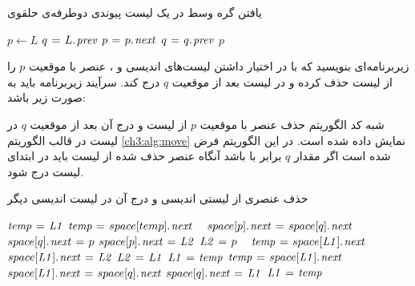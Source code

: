 \begin{algorithm}
\caption{یافتن گره وسط در یک لیست پیوندی دوطرفه‌ی حلقوی}\label{ch3:alg:findMiddle}
\begin{latin}
\begin{algorithmic}[1]
    \State    $p \gets L$
    \State    $q \mathrel{\hspace{1pt}=\hspace{1pt}} L.\hspace*{1pt}\mathit{prev}$
        \State    $p \mathrel{\hspace{1pt}=\hspace{1pt}} p.\hspace*{1pt}\mathit{next}$
        \State    $q \mathrel{\hspace{1pt}=\hspace{1pt}} q.\hspace*{1pt}\mathit{prev}$
    \EndWhile
    \State    \Return $p$
\EndFunction
\end{algorithmic}
\end{latin}
\end{algorithm}


 زیربرنامه‌ای بنویسید که با در اختیار داشتن لیست‌های اندیسی {} و {}، عنصر با موقعیت {$p$} را از لیست {} حذف کرده و در لیست {} بعد از موقعیت {$q$} درج کند. سرآیند زیربرنامه باید به صورت زیر باشد:
\begin{latin}
\begin{algorithmic}[1]
\Statex	{}
\end{algorithmic}
\end{latin}


شبه کد الگوریتم حذف عنصر با موقعیت {$p$} از لیست {} و درج آن بعد از موقعیت {$q$} در لیست {} در قالب الگوریتم {\eqref{ch3:alg:move}} نمایش داده شده است. در این الگوریتم فرض شده است اگر مقدار {$q$} برابر با {} باشد آنگاه عنصر حذف شده از لیست {} باید در ابتدای لیست {} درج شود.
\begin{algorithm}
\caption{حذف عنصری از لیستی اندیسی و درج آن در لیست اندیسی دیگر}\label{ch3:alg:move}
\begin{latin}
\begin{algorithmic}[1]
		\label{ch3:alg:line:mvOutIfBegin}
				\State	$\mathit{temp} \mathrel{\hspace{1pt}=\hspace{1pt}} \mathit{L1}$
				\label{ch3:alg:line:mvWhileBegin}
						\State	$\mathit{temp} \mathrel{\hspace{1pt}=\hspace{1pt}} space[temp].\hspace*{1pt}\mathit{next}$
				\EndWhile\ \label{ch3:alg:line:mvWhileEnd}
				\label{ch3:alg:mvInIf1Begin}
						\State	$space[p].\hspace*{1pt}\mathit{next} \mathrel{\hspace{1pt}=\hspace{1pt}} space[q].\hspace*{1pt}\mathit{next}$
						\State	$space[q].\hspace*{1pt}\mathit{next} \mathrel{\hspace{1pt}=\hspace{1pt}} p$
				\Else
						\State	$space[p].\hspace*{1pt}\mathit{next} \mathrel{\hspace{1pt}=\hspace{1pt}} \mathit{L2}$
						\State	$\mathit{L2} \mathrel{\hspace{1pt}=\hspace{1pt}} p$
				\EndIf\ \label{ch3:alg:line:mvOutIfEnd}
		\Else
				\label{ch3:alg:line:mvOutElseBegin}
						\State	$\mathit{temp} \mathrel{\hspace{1pt}=\hspace{1pt}} space[\mathit{L1}].\hspace*{1pt}\mathit{next}$
						\State	$space[\mathit{L1}].\hspace*{1pt}\mathit{next} \mathrel{\hspace{1pt}=\hspace{1pt}} \mathit{L2}$
						\State	$\mathit{L2} \mathrel{\hspace{1pt}=\hspace{1pt}} \mathit{L1}$
						\State	$\mathit{L1} \mathrel{\hspace{1pt}=\hspace{1pt}} \mathit{temp}$
				\Else
						\State	$\mathit{temp} \mathrel{\hspace{1pt}=\hspace{1pt}} space[\mathit{L1}].\hspace*{1pt}\mathit{next}$
						\State	$space[\mathit{L1}].\hspace*{1pt}\mathit{next} \mathrel{\hspace{1pt}=\hspace{1pt}} space[q].\hspace*{1pt}\mathit{next}$
						\State	$space[q].\hspace*{1pt}\mathit{next} \mathrel{\hspace{1pt}=\hspace{1pt}} \mathit{L1}$
						\State	$\mathit{L1} \mathrel{\hspace{1pt}=\hspace{1pt}} \mathit{temp}$
				\EndIf
		\EndIf\ \label{ch3:alg:line:mvOutElseEnd}
\EndProcedure
\end{algorithmic}
\end{latin}
\end{algorithm}

